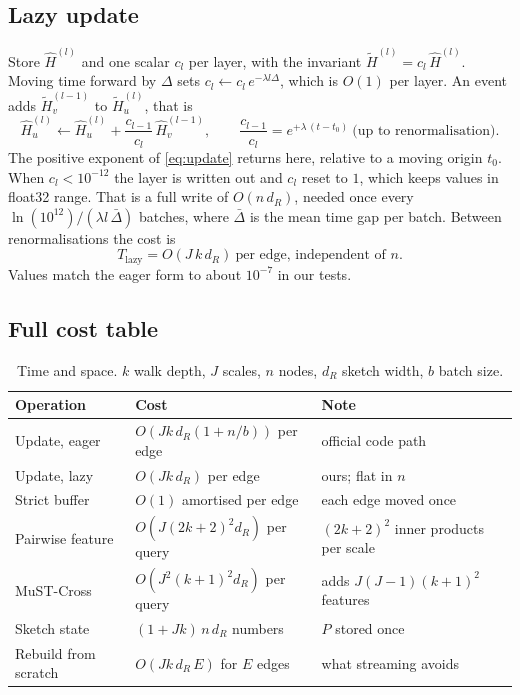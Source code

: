 \documentclass[11pt,a4paper]{article}
\theoremstyle{remark}
\newcommand{\tH}{\widetilde{H}}
\begin{document}
\subsection{Lazy update}
Store $\hat H^{(l)}$ and one scalar $c_l$ per layer, with the invariant $\tH^{(l)}=c_l\,\hat H^{(l)}$. Moving time forward by $\Delta$ sets $c_l\leftarrow c_l\,e^{-\lambda l\Delta}$, which is $O(1)$ per layer. An event adds $\tH_v^{(l-1)}$ to $\tH_u^{(l)}$, that is
\begin{equation}
\hat H_u^{(l)}\leftarrow \hat H_u^{(l)}+\frac{c_{l-1}}{c_l}\,\hat H_v^{(l-1)},\qquad \frac{c_{l-1}}{c_l}=e^{+\lambda\,(t-t_0)}\ \text{(up to renormalisation)}.
\end{equation}
The positive exponent of \eqref{eq:update} returns here, relative to a moving origin $t_0$. When $c_l<10^{-12}$ the layer is written out and $c_l$ reset to $1$, which keeps values in float32 range. That is a full write of $O(n\,d_R)$, needed once every $\ln(10^{12})/(\lambda l\,\bar\Delta)$ batches, where $\bar\Delta$ is the mean time gap per batch. Between renormalisations the cost is
\begin{equation}
T_{\text{lazy}}=O(J\,k\,d_R)\ \text{per edge, independent of } n .
\end{equation}
Values match the eager form to about $10^{-7}$ in our tests.

\subsection{Full cost table}
\begin{table}[h]\centering\small
\begin{tabular}{lll}
\toprule
Operation & Cost & Note\\
\midrule
Update, eager & $O(Jk\,d_R(1+n/b))$ per edge & official code path\\
Update, lazy & $O(Jk\,d_R)$ per edge & ours; flat in $n$\\
Strict buffer & $O(1)$ amortised per edge & each edge moved once\\
Pairwise feature & $O(J(2k+2)^2 d_R)$ per query & $(2k+2)^2$ inner products per scale\\
MuST-Cross & $O(J^2(k+1)^2 d_R)$ per query & adds $J(J-1)(k+1)^2$ features\\
Sketch state & $(1+Jk)\,n\,d_R$ numbers & $P$ stored once\\
Rebuild from scratch & $O(Jk\,d_R\,E)$ for $E$ edges & what streaming avoids\\
\bottomrule
\end{tabular}
\caption{Time and space. $k$ walk depth, $J$ scales, $n$ nodes, $d_R$ sketch width, $b$ batch size.}
\end{table}
\end{document}
